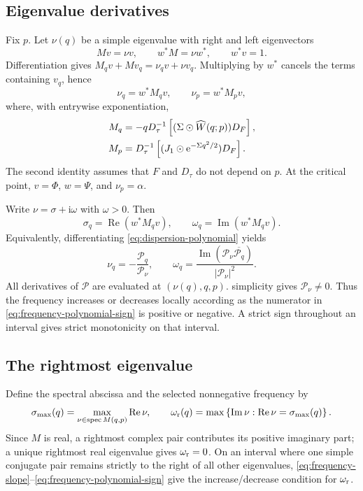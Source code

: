\documentclass[11pt]{article}
\newcommand{\ii}{\mathrm{i}}
\newcommand{\ee}{\mathrm{e}}
\DeclareMathOperator{\RePart}{Re}
\begin{document}
\subsection{Eigenvalue derivatives}
Fix $p$. Let $\nu(q)$ be a simple eigenvalue with right and left eigenvectors
\begin{equation}
 Mv=\nu v,\qquad w^*M=\nu w^*,\qquad w^*v=1.
\end{equation}
Differentiation gives $M_qv+Mv_q=\nu_qv+\nu v_q$. Multiplying by $w^*$
cancels the terms containing $v_q$, hence
\begin{equation}
 \boxed{\nu_q=w^*M_qv,\qquad \nu_p=w^*M_pv,}
 \label{eq:dispersion-derivatives}
\end{equation}
where, with entrywise exponentiation,
\begin{align}
 M_q&=-qD_\tau^{-1}\left[(\Sigma\odot\widehat W(q;p))D_F\right],\notag\\
 M_p&=D_\tau^{-1}\left[(J_1\odot\ee^{-\Sigma q^2/2})D_F\right].
 \label{eq:dispersion-matrix-derivatives}
\end{align}
The second identity assumes that $F$ and $D_\tau$ do not depend on $p$.
At the critical point, $v=\Phi$, $w=\Psi$, and $\nu_p=\alpha$.

Write $\nu=\sigma+\ii\omega$ with $\omega>0$. Then
\begin{equation}
 \sigma_q=\RePart(w^*M_qv),\qquad
 \boxed{\omega_q=\operatorname{Im}(w^*M_qv).}
 \label{eq:frequency-slope}
\end{equation}
Equivalently, differentiating \eqref{eq:dispersion-polynomial} yields
\begin{equation}
 \nu_q=-\frac{\mathcal P_q}{\mathcal P_\nu},\qquad
 \boxed{\omega_q=
 \frac{\operatorname{Im}(\mathcal P_\nu\overline{\mathcal P_q})}
 {|\mathcal P_\nu|^2}.}
 \label{eq:frequency-polynomial-sign}
\end{equation}
All derivatives of $\mathcal P$ are evaluated at $(\nu(q),q,p)$.
simplicity gives $\mathcal P_\nu\neq0$. Thus the frequency increases
or decreases locally according as the numerator in
\eqref{eq:frequency-polynomial-sign} is positive or negative. A strict sign
throughout an interval gives strict monotonicity on that interval.

\subsection{The rightmost eigenvalue}
Define the spectral abscissa and the selected nonnegative frequency by
\begin{equation}
 \sigma_{\max}(q)=\max_{\nu\in\operatorname{spec}M(q,p)}\RePart\nu,
 \qquad
 \omega_{\rm r}(q)=\max\left\{\operatorname{Im}\nu:
 \RePart\nu=\sigma_{\max}(q)\right\}.
 \label{eq:rightmost-frequency}
\end{equation}
Since $M$ is real, a rightmost complex pair contributes its positive imaginary
part; a unique rightmost real eigenvalue gives $\omega_{\rm r}=0$.
On an interval where one simple conjugate pair remains strictly to the right
of all other eigenvalues, \eqref{eq:frequency-slope}--\eqref{eq:frequency-polynomial-sign}
give the increase/decrease condition for $\omega_{\rm r}$.
\end{document}
